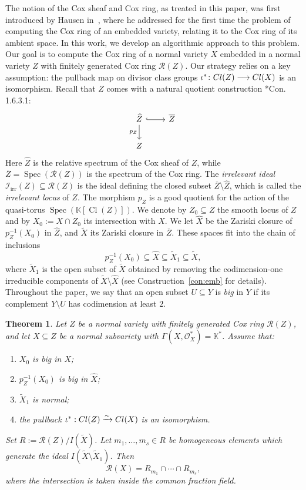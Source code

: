 \documentclass{amsart}
\newtheorem{introthm}{Theorem}
\theoremstyle{definition}
\theoremstyle{remark}
\begin{document}
The notion of the Cox sheaf and Cox ring, as treated in this paper, was first introduced by Hausen in~\cite{hau}, where he addressed for the first time the problem of computing the Cox ring of an embedded variety, relating it to the Cox ring of its ambient space.
In this work, we develop an algorithmic approach to this problem.
Our goal is to compute the Cox ring of a normal variety $X$ embedded in a normal variety $Z$ with finitely generated Cox ring $\mathcal R(Z)$.
Our strategy relies on a key assumption: the pullback map on divisor class groups
$\iota^\ast\colon {\rm Cl}(Z) \longrightarrow {\rm Cl}(X)$
is an isomorphism.
Recall that $Z$ comes with a natural quotient construction
\cite{adhl}*{Con. 1.6.3.1}:
\[
\begin{tikzcd}
\widehat Z \arrow[r, hook] \arrow[d, "p_Z"'] & \overline Z \\
Z &
\end{tikzcd}
\]
Here $\widehat Z$ is the relative spectrum of the Cox sheaf of $Z$, while
$\overline Z = \operatorname{Spec}(\mathcal R(Z))$ is the spectrum of the Cox ring.
The \emph{irrelevant ideal} $\mathscr I_{\mathrm{irr}}(Z) \subseteq \mathcal R(Z)$ is the ideal defining the closed subset $\overline Z \setminus \widehat Z$, which is called the \emph{irrelevant locus} of $Z$.
The morphism $p_Z$ is a good quotient for the action of the quasi-torus
$\operatorname{Spec}(\mathbb K[\operatorname{Cl}(Z)])$.
We denote by $Z_0 \subseteq Z$ the smooth locus of $Z$ and by $X_0 := X \cap Z_0$ its intersection with $X$.
We let $\widehat X$ be the Zariski closure of $p_Z^{-1}(X_0)$ in $\widehat Z$, and
$\tilde X$ its Zariski closure in $\overline Z$.
These spaces fit into the chain of inclusions
\[
  p_Z^{-1}(X_0)
  \subseteq
  \widehat X
  \subseteq
  \tilde X_1
  \subseteq
  \tilde X,
\]
where $\tilde X_1$ is the open subset of $\tilde X$ obtained by removing the codimension-one irreducible components of $\tilde X \setminus \widehat X$ (see Construction~\ref{con:emb} for details).
Throughout the paper, we say that an open subset $U \subseteq Y$ is \emph{big} in $Y$ if its complement $Y \setminus U$ has codimension at least $2$.

\begin{introthm}\label{mteo}
Let $Z$ be a normal variety with finitely generated Cox ring $\mathcal R(Z)$, and let $X\subseteq Z$ be a normal subvariety with $\Gamma(X,\mathcal O_X^*)=\mathbb K^*$.
Assume that:
\begin{enumerate}
\item $X_0$ is big in $X$;
\item $p_Z^{-1}(X_0)$ is big in $\widehat X$;
\item $\tilde X_1$ is normal;
\item the pullback $\iota^\ast:{\rm Cl}(Z)\xrightarrow{\sim}{\rm Cl}(X)$ is an isomorphism.
\end{enumerate}
Set $R:=\mathcal R(Z)/I(\tilde X)$.
Let $m_1,\dots,m_s\in R$ be homogeneous elements which generate the ideal
$I(\tilde X\setminus\tilde X_1)$.
Then
\[
\mathcal R(X)= R_{m_1}\cap\cdots\cap R_{m_s},
\]
where the intersection is taken inside the common fraction field.
\end{introthm}
\end{document}
